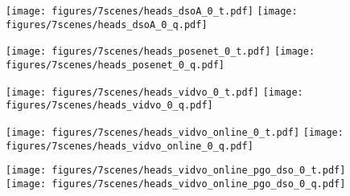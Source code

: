 \begin{figure*}
    \begin{subfigure}{0.19\linewidth}
        \centering
        \texttt{[image: figures/7scenes/heads\_dsoA\_0\_t.pdf]}
        \texttt{[image: figures/7scenes/heads\_dsoA\_0\_q.pdf]}
    \end{subfigure}
    \hfill
    \begin{subfigure}{0.19\linewidth}
        \centering
        \texttt{[image: figures/7scenes/heads\_posenet\_0\_t.pdf]}
        \texttt{[image: figures/7scenes/heads\_posenet\_0\_q.pdf]}
    \end{subfigure}
    \hfill
    \begin{subfigure}{0.19\linewidth}
        \centering
        \texttt{[image: figures/7scenes/heads\_vidvo\_0\_t.pdf]}
        \texttt{[image: figures/7scenes/heads\_vidvo\_0\_q.pdf]}
    \end{subfigure}
    \hfill
    \begin{subfigure}{0.19\linewidth}
        \centering
        \texttt{[image: figures/7scenes/heads\_vidvo\_online\_0\_t.pdf]}
        \texttt{[image: figures/7scenes/heads\_vidvo\_online\_0\_q.pdf]}
    \end{subfigure}
    \hfill
    \begin{subfigure}{0.19\linewidth}
        \centering
        \texttt{[image: figures/7scenes/heads\_vidvo\_online\_pgo\_dso\_0\_t.pdf]}
        \texttt{[image: figures/7scenes/heads\_vidvo\_online\_pgo\_dso\_0\_q.pdf]}
    \end{subfigure}







\end{figure*}
